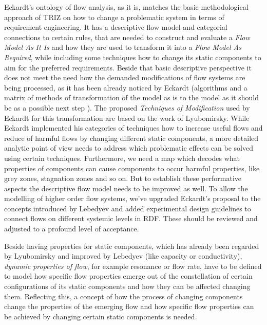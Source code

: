 \documentclass[a4paper,11pt]{article}
\begin{document}
Eckardt's ontology of flow analysis, as it is, matches the basic
methodological approach of TRIZ on how to change a problematic system in terms
of requirement engineering. It has a descriptive flow model and categorial
connections to certain rules, that are needed to construct and evaluate a
\emph{Flow Model As It Is} and how they are used to transform it into a
\emph{Flow Model As Required}, while including some techniques how to change
its static components to aim for the preferred requirements. Beside that basic
descriptive perspective it does not meet the need how the demanded
modifications of flow systems are being processed, as it has been already
noticed by Eckardt (algorithms and a matrix of methods of transformation of
the model as is to the model as it should be as a possible next step
\cite{Eckardt2020}). The proposed \emph{Techniques of Modification} used by
Eckardt for this transformation are based on the work of Lyubomirsky. While
Eckardt implemented his categories of techniques how to increase useful flows
and reduce of harmful flows by changing different static components, a more
detailed analytic point of view needs to address which problematic effects can
be solved using certain techniques. Furthermore, we need a map which decodes
what properties of components can cause components to occur harmful
properties, like grey zones, stagnation zones and so on.  But to establish
these performative aspects the descriptive flow model needs to be improved as
well. To allow the modelling of higher order flow systems, we've upgraded
Eckardt's proposal to the concepts introduced by Lebedyev \cite{Lebedyev2015}
and added experimental design guidelines to connect flows on different
systemic levels in RDF. These should be reviewed and adjusted to a profound
level of acceptance.

Beside having properties for static components, which has already been
regarded by Lyubo\-mirsky and improved by Lebedyev (like capacity or
conductivity), \emph{dynamic properties of flow}, for example resonance or
flow rate, have to be defined to model how specific flow properties emerge out
of the constellation of certain configurations of its static components and
how they can be affected changing them.  Reflecting this, a concept of how the
process of changing components change the properties of the emerging flow and
how specific flow properties can be achieved by changing certain static
components is needed.
\end{document}
